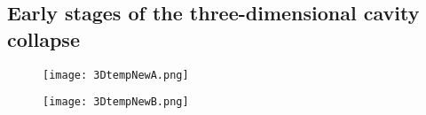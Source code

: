 \documentclass[3p,times,twocolumn]{elsarticle}
\begin{document}
\subsection{Early stages of the three-dimensional cavity collapse}

\begin{figure*}
        \begin{subfigure}[b]{0.49\textwidth}
\texttt{[image: 3DtempNewA.png]}
        \end{subfigure}
        \begin{subfigure}[b]{0.49\textwidth}
\texttt{[image: 3DtempNewB.png]}
        \end{subfigure}
\caption{ A sample of plots to visualise the shock-bubble collapse in 3D. Slices through the centre of the cavity in the $xy$ and $xz$ planes are shown, along with a selected slice on the $yz$ plane. Early stages of the collapse are shown, illustrating the generation of the release wave in nitromethane and the lobe generation before jet impact.  All axes in \SI{}{\meter}.}
\label{3Dtemp}
\end{figure*}
\end{document}
